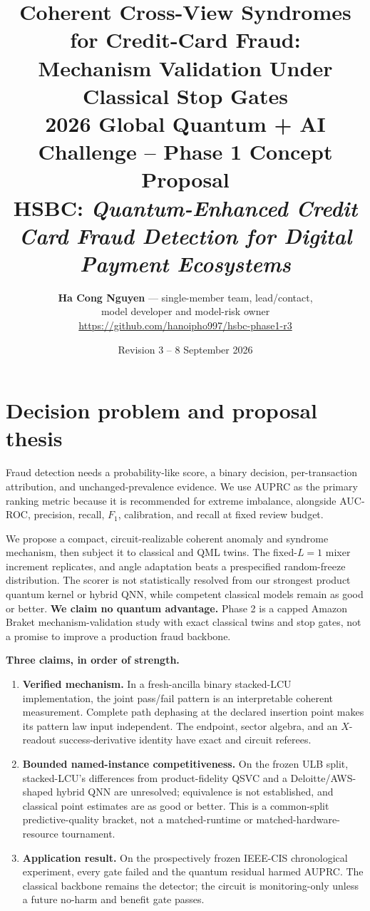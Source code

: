 \documentclass[10pt,a4paper]{article}
\title{\vspace{-1.8em}\textbf{Coherent Cross-View Syndromes for Credit-Card Fraud:\\
Mechanism Validation Under Classical Stop Gates}\\[0.3em]
\large 2026 Global Quantum + AI Challenge -- Phase 1 Concept Proposal\\
\normalsize HSBC: \emph{Quantum-Enhanced Credit Card Fraud Detection for
Digital Payment Ecosystems}}
\author{\textbf{Ha Cong Nguyen} --- single-member team, lead/contact,\\[-.1em]
\small model developer and model-risk owner\\[-.1em]
\small\url{https://github.com/hanoipho997/hsbc-phase1-r3}}
\date{Revision 3 -- 8 September 2026}
\begin{document}
\maketitle
\vspace{-1.4em}

\section{Decision problem and proposal thesis}

Fraud detection needs a probability-like score, a binary decision,
per-transaction attribution, and unchanged-prevalence evidence. We use AUPRC
as the primary ranking metric because it is recommended for extreme
imbalance, alongside AUC-ROC, precision, recall, $F_1$, calibration, and
recall at fixed review budget.

We propose a compact, circuit-realizable coherent anomaly and syndrome
mechanism, then subject it to classical and QML twins. The fixed-$L{=}1$
mixer increment replicates, and angle adaptation beats a prespecified
random-freeze distribution. The scorer is not statistically resolved from
our strongest product quantum kernel or hybrid QNN, while competent classical
models remain as good or better. \textbf{We claim no quantum advantage.}
Phase 2 is a capped Amazon Braket mechanism-validation study with exact
classical twins and stop gates, not a promise to improve a production fraud
backbone.

\textbf{Three claims, in order of strength.}
\begin{enumerate}
\item \textbf{Verified mechanism.} In a fresh-ancilla binary stacked-LCU
implementation, the joint pass/fail pattern is an interpretable coherent
measurement. Complete path dephasing at the declared insertion point makes
its pattern law input independent. The endpoint, sector algebra, and an
$X$-readout success-derivative identity have exact and circuit referees.
\item \textbf{Bounded named-instance competitiveness.} On the frozen ULB
split, stacked-LCU's differences from product-fidelity QSVC and a
Deloitte/AWS-shaped hybrid QNN are unresolved; equivalence is not established,
and classical point estimates are as good or better. This is a common-split
predictive-quality bracket, not a matched-runtime or matched-hardware-resource
tournament.
\item \textbf{Application result.} On the prospectively frozen IEEE-CIS
chronological experiment, every gate failed and the quantum residual harmed
AUPRC. The classical backbone remains the detector; the circuit is
monitoring-only unless a future no-harm and benefit gate passes.
\end{enumerate}
\end{document}
